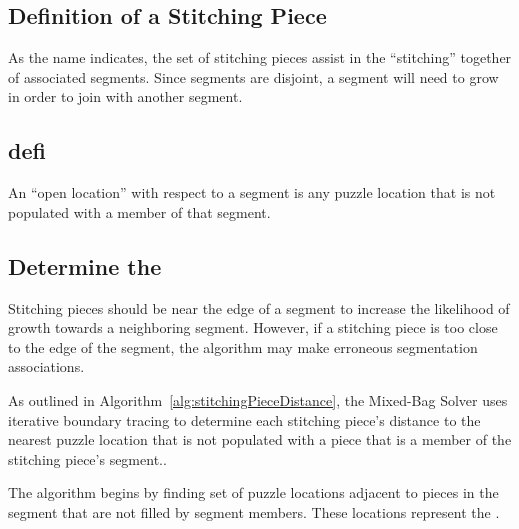 \subsection{Definition of a Stitching Piece}

As the name indicates, the set of stitching pieces assist in the ``stitching'' together of associated segments.  Since segments are disjoint, a segment will need to grow in order to join with another segment.  

\subsection{defi}



An ``open location'' with respect to a segment is any puzzle location that is not populated with a member of that segment.  

\subsection{Determine the }

Stitching pieces should be near the edge of a segment to increase the likelihood of growth towards a neighboring segment.  However,  if a stitching piece is too close to the edge of the segment, the algorithm may make erroneous segmentation associations.   

As outlined in Algorithm~\ref{alg:stitchingPieceDistance}, the Mixed-Bag Solver uses iterative boundary tracing to determine each stitching piece's distance to the nearest puzzle location that is not populated with a piece that is a member of the stitching piece's segment..

The algorithm begins by finding set of puzzle locations adjacent to pieces in the segment that are not filled by segment members.  These locations represent the .

